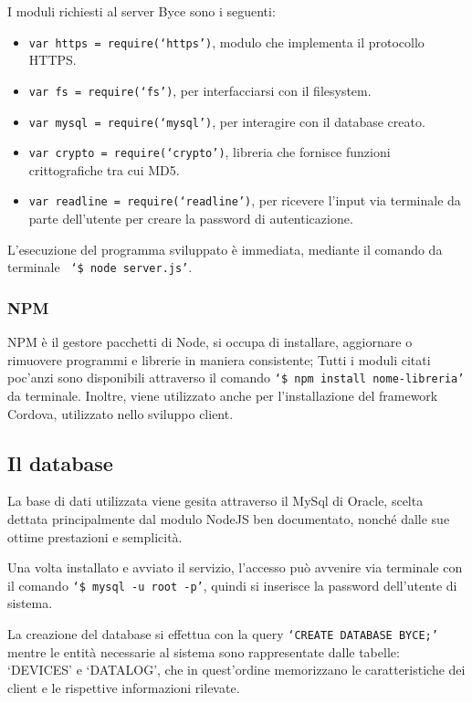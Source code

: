 \documentclass[target=bach]{thud}
\begin{document}
                I moduli richiesti al server Byce sono i seguenti:
                \begin{itemize}
                    \setlength{\itemsep}{1pt}
                    \item \texttt{var https = require(`https')}, modulo che implementa il protocollo HTTPS.
                    \item \texttt{var fs = require(`fs')}, per interfacciarsi con il filesystem.
                    \item \texttt{var mysql = require(`mysql')}, per interagire con il database creato.
                    \item \texttt{var crypto = require(`crypto')}, libreria che fornisce funzioni crittografiche tra cui MD5.
                    \item \texttt{var readline = require(`readline')}, per ricevere l'input via terminale da parte dell'utente per creare la password di autenticazione.
                \end{itemize}

                L'esecuzione del programma sviluppato è immediata, mediante il comando da terminale \texttt{ `\$ node server.js'}.

                \subsubsection{NPM}
                NPM è il gestore pacchetti di Node, si occupa di installare, aggiornare o rimuovere programmi e librerie in maniera consistente; Tutti i moduli citati poc'anzi sono disponibili attraverso il comando \texttt{`\$ npm install {{nome-libreria}}'} da terminale.
                Inoltre, viene utilizzato anche per l'installazione del framework Cordova, utilizzato nello sviluppo client.


            \subsection{Il database}
                La base di dati utilizzata viene gesita attraverso il MySql di Oracle, scelta dettata principalmente dal modulo NodeJS ben documentato, nonché dalle sue ottime prestazioni e semplicità.

                Una volta installato e avviato il servizio, l'accesso può avvenire via terminale con il comando \texttt{`\$ mysql -u root -p'}, quindi si inserisce la password dell'utente di sistema.

                La creazione del database si effettua con la query \texttt{`CREATE DATABASE BYCE;'} mentre le entità necessarie al sistema sono rappresentate dalle tabelle: `DEVICES' e `DATALOG', che in quest'ordine memorizzano le caratteristiche dei client e le rispettive informazioni rilevate.
\end{document}
